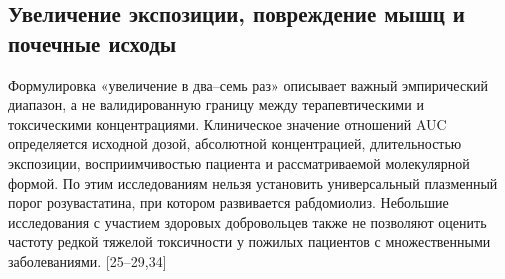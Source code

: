 \documentclass[11pt]{article}
\begin{document}
\subsection{Увеличение экспозиции, повреждение мышц и почечные исходы}

Формулировка «увеличение в два--семь раз» описывает важный эмпирический диапазон, а не валидированную границу между терапевтическими и токсическими концентрациями. Клиническое значение отношений AUC определяется исходной дозой, абсолютной концентрацией, длительностью экспозиции, восприимчивостью пациента и рассматриваемой молекулярной формой. По этим исследованиям нельзя установить универсальный плазменный порог розувастатина, при котором развивается рабдомиолиз. Небольшие исследования с участием здоровых добровольцев также не позволяют оценить частоту редкой тяжелой токсичности у пожилых пациентов с множественными заболеваниями. [25--29,34]
\end{document}
